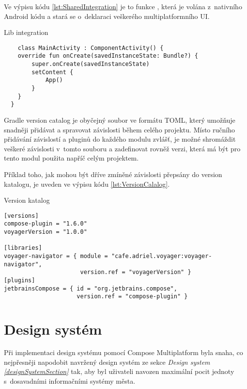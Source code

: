 Ve výpisu kódu \ref{lst:SharedIntegration} je to funkce , která je volána z~nativního Android kódu a stará se
o~deklaraci veškerého multiplatformního UI.
\begin{listing}[H]
  \caption{Lib integration}\label{lst:SharedIntegration}
  \begin{verbatim}
    class MainActivity : ComponentActivity() {
    override fun onCreate(savedInstanceState: Bundle?) {
        super.onCreate(savedInstanceState)
        setContent {
            App()
        }
    }
  }
\end{verbatim}
\end{listing}






Gradle version catalog je obyčejný soubor ve formátu TOML, který umožňuje snadněji přidávat a spravovat závislosti během celého projektu. 
Místo ručního přidávání závislostí a pluginů do každého modulu zvlášť, je možné shromáždit veškeré závislosti v~tomto souboru a zadefinovat rovněž
verzi, která má být pro tento modul použita napříč celým projektem. 

Příklad toho, jak mohou být dříve zmíněné závislosti přepsány do version
katalogu, je uveden ve výpisu kódu \ref{lst:VersionCalalog}.

\begin{listing}[H]
\caption{Version katalog}\label{lst:VersionCalalog}
\begin{verbatim}
[versions]
compose-plugin = "1.6.0"
voyagerVersion = "1.0.0"
    
[libraries]
voyager-navigator = { module = "cafe.adriel.voyager:voyager-navigator", 
                      version.ref = "voyagerVersion" }
[plugins]
jetbrainsCompose = { id = "org.jetbrains.compose",
                     version.ref = "compose-plugin" }
\end{verbatim}
\end{listing}



\section{Design systém} \label{designSystemImpl}
Při implementaci design systému pomocí Compose Multiplatform byla snaha, co nejpřesněji napodobit navržený design systém ze sekce 
\textit{Design system \ref{designSystemSection}}
tak, aby byl uživateli navozen maximální pocit jednoty s~dosavadními informačními systémy města.


